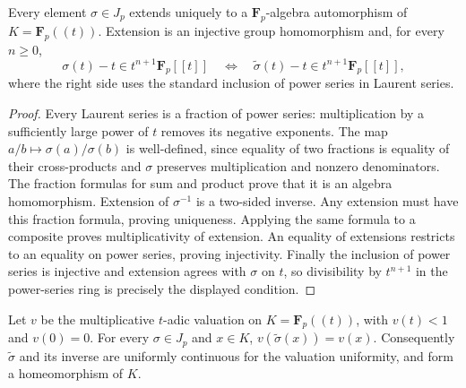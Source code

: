 \begin{lemma}
\label{lem:nottingham-laurent-extension}
\leanok
Every element $\sigma\in J_p$ extends uniquely to a
$\mathbf F_p$-algebra automorphism of $K=\mathbf F_p((t))$.
Extension is an injective group homomorphism and, for every $n\ge0$,
\[
 \sigma(t)-t\in t^{n+1}\mathbf F_p[[t]]\quad\Longleftrightarrow\quad
 \widetilde\sigma(t)-t\in t^{n+1}\mathbf F_p[[t]],
\]
where the right side uses the standard inclusion of power series
in Laurent series.
\end{lemma}

\begin{proof}
Every Laurent series is a fraction of power series: multiplication
by a sufficiently large power of $t$ removes its negative exponents.
The map $a/b\mapsto\sigma(a)/\sigma(b)$ is well-defined, since equality
of two fractions is equality of their cross-products and $\sigma$
preserves multiplication and nonzero denominators. The fraction
formulas for sum and product prove that it is an algebra homomorphism.
Extension of $\sigma^{-1}$ is a two-sided inverse. Any extension must
have this fraction formula, proving uniqueness. Applying the same
formula to a composite proves multiplicativity of extension.
An equality of extensions restricts to an equality on power series,
proving injectivity. Finally the inclusion of power series is injective
and extension agrees with $\sigma$ on $t$, so divisibility by $t^{n+1}$
in the power-series ring is precisely the displayed condition.
\end{proof}

\begin{lemma}
\label{lem:nottingham-laurent-isometry}
\leanok
Let $v$ be the multiplicative $t$-adic valuation on
$K=\mathbf F_p((t))$, with $v(t)<1$ and $v(0)=0$.
For every $\sigma\in J_p$ and $x\in K$,
$v(\widetilde\sigma(x))=v(x)$.
Consequently $\widetilde\sigma$ and its inverse are uniformly
continuous for the valuation uniformity, and form a homeomorphism of $K$.
\end{lemma}

